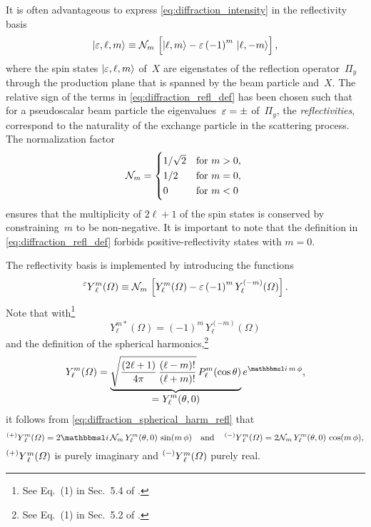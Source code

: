 It is often advantageous to express \cref{eq:diffraction_intensity} in
the reflectivity basis
\begin{equation}
  \label{eq:diffraction_refl_def}
  \ket{\refl, \ell, m}
  \equiv \mathcal{N}_m\, \sBrk[2]{\ket{\ell, m} - \refl\, {(-1)}^m\, \ket{\ell, {-m}}},
\end{equation}
where the spin states $\ket{\varepsilon, \ell, m}$ of~$X$ are eigenstates of
the reflection operator~$\Pi_y$ through the production plane that is
spanned by the beam particle and~$X$.  The relative sign of the terms
in \cref{eq:diffraction_refl_def} has been chosen such that for a
pseudoscalar beam particle the eigenvalues~$\varepsilon = \pm$ of~$\Pi_y$,
\ie the \emph{reflectivities}, correspond to the naturality of the
exchange particle in the scattering process.  The normalization factor
\begin{equation}
  \label{eq:refl_norm}
  \mathcal{N}_m
  = \begin{cases*}
      1 / \sqrt{2} & for $m > 0$, \\
      1 / 2        & for $m = 0$, \\
      0            & for $m < 0$
    \end{cases*}
\end{equation}
ensures that the multiplicity of $2 \ell + 1$ of the spin states is
conserved by constraining~$m$ to be non-negative.  It is important to
note that the definition in \cref{eq:diffraction_refl_def} forbids
positive-reflectivity states with $m = 0$.

The reflectivity basis is implemented by introducing the functions
\begin{equation}
  \label{eq:diffraction_spherical_harm_refl}
  \prescript{\refl}{}{Y}_\ell^m(\Omega)
  \equiv \mathcal{N}_m\, \sBrk[2]{Y_\ell^m(\Omega) - \refl\, {(-1)}^m\, Y_\ell^{(-m)}(\Omega)}.
\end{equation}
Note that with\footnote{See Eq.~(1) in Sec.~5.4 of
.}
\begin{equation}
  \label{eq:spherical_harm_sym}
  Y_\ell^{m *}(\Omega)
  = {(-1)}^m\, Y_\ell^{(-m)}(\Omega)
\end{equation}
and the definition of the spherical harmonics,\footnote{See Eq.~(1) in
Sec.~5.2 of .}
\begin{equation}
  \label{eq:sspherical_harm_def}
  Y_\ell^m(\Omega)
  = \dUnderbrace{\sqrt{\frac{(2 \ell + 1)}{4 \pi}\, \frac{(\ell -m)!}{(\ell + m)!}}\, P_\ell^m(\cos\theta)}{= Y_\ell^m(\theta, 0)}\, e^{\imag\, m\, \phi},
\end{equation}
it follows
from \cref{eq:diffraction_spherical_harm_refl} that
\begin{equation}
  \prescript{(+)}{}{Y}_\ell^m(\Omega)
  = 2 \imag\, \mathcal{N}_m\, Y_\ell^m(\theta, 0)\, \sin(m\, \phi)
  \quad\text{and}\quad
  \prescript{(-)}{}{Y}_\ell^m(\Omega)
  = 2 \mathcal{N}_m\, Y_\ell^m(\theta, 0)\, \cos(m\, \phi),
\end{equation}
\ie $\prescript{(+)}{}{Y}_\ell^m(\Omega)$ is purely imaginary and
$\prescript{(-)}{}{Y}_\ell^m(\Omega)$ purely real.

